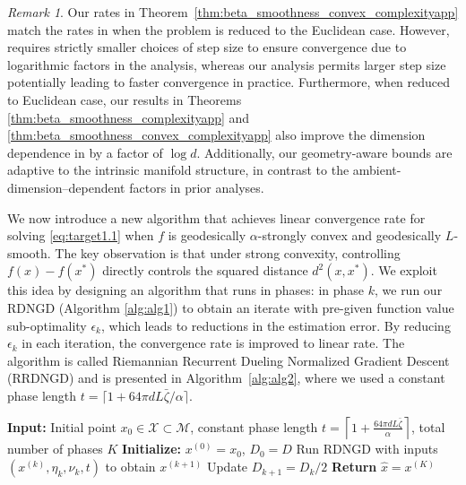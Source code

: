 \documentclass{article}
\theoremstyle{plain}
\theoremstyle{definition}
\theoremstyle{remark}
\newtheorem{remark}[theorem]{Remark}
\begin{document}
\begin{remark}
Our rates in
Theorem~\ref{thm:beta_smoothness_convex_complexityapp} match the rates in \citep{pmlr-v139-saha21b} when the problem is reduced to the Euclidean case. However, \citep{pmlr-v139-saha21b} requires strictly smaller choices of step size to ensure convergence due to logarithmic factors in the analysis, whereas our analysis permits larger step size potentially leading to faster convergence in practice. Furthermore, when reduced to Euclidean case, our results in Theorems \ref{thm:beta_smoothness_complexityapp} and \ref{thm:beta_smoothness_convex_complexityapp} also improve the dimension dependence in \citep{zhang2024comparisons} by a factor of $\log d$. Additionally, our geometry-aware bounds are adaptive to the intrinsic manifold structure, in contrast to the ambient-dimension–dependent factors in prior analyses.
\end{remark}


We now introduce a new algorithm that achieves linear convergence rate for solving \eqref{eq:target1.1} when $f$ is geodesically $\alpha$-strongly convex and geodesically $L$-smooth. The key observation is that under strong convexity, controlling $f(x)-f(x^*)$ directly controls the squared distance $d^2(x,x^*)$. We exploit this idea by designing an algorithm that runs in phases: in phase $k$, we run our RDNGD (Algorithm \ref{alg:alg1}) to obtain an iterate with pre-given function value sub-optimality $\epsilon_k$, which leads to reductions in the estimation error. By reducing $\epsilon_k$ in each iteration, the convergence rate is improved to linear rate. 
The algorithm is called Riemannian Recurrent Dueling Normalized Gradient Descent (RRDNGD) and is presented in Algorithm~\ref{alg:alg2}, where we used a constant phase length $t = \lceil{1+{64\pi d L \bar{\zeta}}/{\alpha}}\rceil$. 


\begin{algorithm}[t]
\caption{Riemannian Recurrent Dueling Normalized Gradient Descent (\textbf{RRDNGD})}
\label{alg:alg2}
\begin{algorithmic}[1]
\STATE \textbf{Input:} Initial point $x_0 \in \mathcal{X} \subset \mathcal{M}$, constant phase length $t = \left\lceil 1 + \frac{64\pi d L \bar{\zeta}}{\alpha} \right\rceil$, total number of phases $K$
\STATE \textbf{Initialize:} $x^{(0)}=x_0$, $D_0 = D$
    \STATE Run RDNGD with inputs $(x^{(k)}, \eta_k, \nu_k, t)$ to obtain $x^{(k+1)}$
    \STATE Update $D_{k+1} = D_{k}/2$
\ENDFOR
\STATE \textbf{Return} $\hat{x} = x^{(K)}$
\end{algorithmic}
\end{algorithm}
\end{document}
